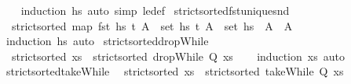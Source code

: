 \begin{isabellebody}
%
\isadelimproof
\ \ %
\endisadelimproof
%
\isatagproof
{}\isamarkupfalse%
\ {\isacharparenleft}{\kern0pt}induction\ hs{\isacharparenright}{\kern0pt}\ {\isacharparenleft}{\kern0pt}auto\ simp{\isacharcolon}{\kern0pt}\ le{\isacharunderscore}{\kern0pt}def{\isacharparenright}{\kern0pt}%
\endisatagproof
{\isafoldproof}%
%
\isadelimproof
\isanewline
%
\endisadelimproof
\isanewline
{}\isamarkupfalse%
\ strict{\isacharunderscore}{\kern0pt}sorted{\isacharunderscore}{\kern0pt}fst{\isacharunderscore}{\kern0pt}unique{\isacharunderscore}{\kern0pt}snd{\isacharcolon}{\kern0pt}\isanewline
\ \ {\isachardoublequoteopen}{\isasymlbrakk}strict{\isacharunderscore}{\kern0pt}sorted\ {\isacharparenleft}{\kern0pt}map\ fst\ hs{\isacharparenright}{\kern0pt}{\isacharsemicolon}{\kern0pt}\ {\isacharparenleft}{\kern0pt}t{\isacharcomma}{\kern0pt}\ A{\isacharparenright}{\kern0pt}\ {\isasymin}\ set\ hs{\isacharsemicolon}{\kern0pt}\ {\isacharparenleft}{\kern0pt}t{\isacharcomma}{\kern0pt}\ A{\isacharprime}{\kern0pt}{\isacharparenright}{\kern0pt}\ {\isasymin}\ set\ hs{\isasymrbrakk}\ {\isasymLongrightarrow}\ A\ {\isacharequal}{\kern0pt}\ A{\isacharprime}{\kern0pt}{\isachardoublequoteclose}\isanewline
%
\isadelimproof
\ \ %
\endisadelimproof
%
\isatagproof
{}\isamarkupfalse%
\ {\isacharparenleft}{\kern0pt}induction\ hs{\isacharparenright}{\kern0pt}\ auto%
\endisatagproof
{\isafoldproof}%
%
\isadelimproof
\isanewline
%
\endisadelimproof
\isanewline
{}\isamarkupfalse%
\ strict{\isacharunderscore}{\kern0pt}sorted{\isacharunderscore}{\kern0pt}dropWhile{\isacharcolon}{\kern0pt}\isanewline
\ \ {\isachardoublequoteopen}strict{\isacharunderscore}{\kern0pt}sorted\ xs\ {\isasymLongrightarrow}\ strict{\isacharunderscore}{\kern0pt}sorted\ {\isacharparenleft}{\kern0pt}dropWhile\ Q\ xs{\isacharparenright}{\kern0pt}{\isachardoublequoteclose}\isanewline
%
\isadelimproof
\ \ %
\endisadelimproof
%
\isatagproof
{}\isamarkupfalse%
\ {\isacharparenleft}{\kern0pt}induction\ xs{\isacharparenright}{\kern0pt}\ auto%
\endisatagproof
{\isafoldproof}%
%
\isadelimproof
\isanewline
%
\endisadelimproof
\isanewline
{}\isamarkupfalse%
\ strict{\isacharunderscore}{\kern0pt}sorted{\isacharunderscore}{\kern0pt}takeWhile{\isacharcolon}{\kern0pt}\isanewline
\ \ {\isachardoublequoteopen}strict{\isacharunderscore}{\kern0pt}sorted\ xs\ {\isasymLongrightarrow}\ strict{\isacharunderscore}{\kern0pt}sorted\ {\isacharparenleft}{\kern0pt}takeWhile\ Q\ xs{\isacharparenright}{\kern0pt}{\isachardoublequoteclose}\isanewline
%
\isadelimproof

\end{isabellebody}
